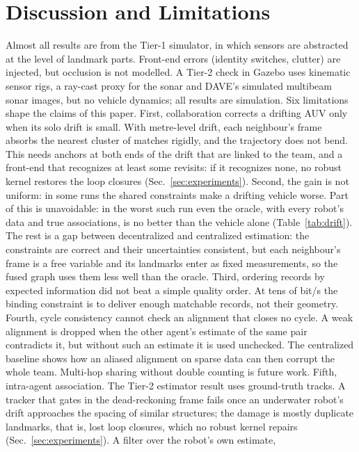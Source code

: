 \section{Discussion and Limitations}
\label{sec:discussion}
Almost all results are from the Tier-1 simulator, in which sensors are abstracted at the level of
landmark parts. Front-end errors (identity switches, clutter) are injected, but occlusion is
not modelled. A Tier-2 check in Gazebo uses kinematic sensor rigs, a ray-cast proxy for the
sonar and DAVE's simulated multibeam sonar images, but no vehicle dynamics; all results are
simulation. Six limitations shape the claims of this paper.
First, collaboration corrects a drifting AUV only when its solo drift is small. With metre-level
drift, each neighbour's frame absorbs the nearest cluster of matches rigidly, and the
trajectory does not bend. This needs anchors at both ends of the drift that are linked to the
team, and a front-end that recognizes at least some revisits: if it recognizes none, no robust
kernel restores the loop closures (Sec.~\ref{sec:experiments}).
Second, the gain is not uniform: in some runs the shared constraints make a drifting vehicle
worse. Part of this is unavoidable: in the worst such run even the oracle, with every robot's
data and true associations, is no better than the vehicle alone (Table~\ref{tab:drift}). The
rest is a gap between decentralized and centralized estimation: the constraints are correct and
their uncertainties consistent, but each neighbour's frame is a free variable and its landmarks
enter as fixed measurements, so the fused graph uses them less well than the oracle.
Third, ordering records by expected information did not beat a simple quality order. At
tens of bit/s the binding constraint is to deliver enough matchable records, not their
geometry.
Fourth, cycle consistency cannot check an alignment that closes no cycle. A weak alignment is
dropped when the other agent's estimate of the same pair contradicts it, but without such an
estimate it is used unchecked. The centralized baseline shows how an aliased alignment on sparse
data can then corrupt the whole team.
Multi-hop sharing without double counting is future work.
Fifth, intra-agent association. The Tier-2 estimator result uses ground-truth tracks. A tracker
that gates in the dead-reckoning frame fails once an underwater robot's drift approaches the
spacing of similar structures; the damage is mostly duplicate landmarks, that is, lost loop
closures, which no robust kernel repairs (Sec.~\ref{sec:experiments}). A filter over the robot's own estimate,

